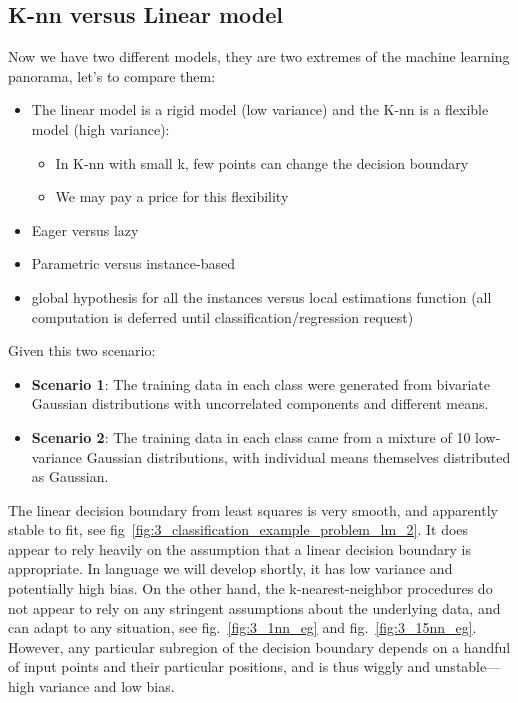 \documentclass[../main.tex]{subfiles}
\begin{document}
\subsection{K-nn versus Linear model}
Now we have two different models, they are two extremes of the machine learning panorama, let's to compare them:
\begin{itemize}
    \item The linear model is a rigid model (low variance) and the K-nn is a flexible model (high variance):
    \begin{itemize}
        \item In K-nn with small k, few points can change the decision boundary
        \item We may pay a price for this flexibility
    \end{itemize}
    
    \item Eager versus lazy
    
    \item Parametric versus instance-based
    
    \item global hypothesis for all the instances versus local estimations function (all computation is deferred until classification/regression request) 
\end{itemize}
Given this two scenario:
\begin{itemize}
    \item \textbf{Scenario 1}: The training data in each class were generated from bivariate Gaussian distributions with uncorrelated components and different means.
    \item \textbf{Scenario 2}: The training data in each class came from a mixture of 10 low- variance Gaussian distributions, with individual means themselves distributed as Gaussian.
\end{itemize}

The linear decision boundary from least squares is very smooth, and apparently stable to fit, see fig~\ref{fig:3_classification_example_problem_lm_2}. It does appear to rely heavily on the assumption that a linear decision boundary is appropriate. In language we will develop shortly, it has low variance and potentially high bias.
On the other hand, the k-nearest-neighbor procedures do not appear to rely on any stringent assumptions about the underlying data, and can adapt to any situation, see fig.~\ref{fig:3_1nn_eg} and fig.~\ref{fig:3_15nn_eg}. However, any particular subregion of the decision boundary depends on a handful of input points and their particular positions, and is thus wiggly and unstable—high variance and low bias.\\
\end{document}
